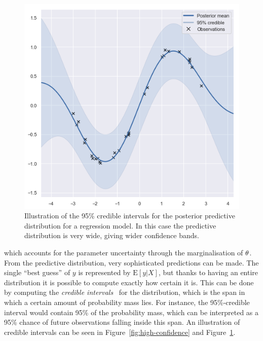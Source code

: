 \begin{figure}
\begin{minipage}{.46\textwidth}
    \includegraphics[scale=0.5,width=\textwidth]{figures/low-confidence}
    \caption{Illustration of the 95\% credible intervals for the
    posterior predictive distribution for a regression model. In this
    case the predictive distribution is very wide, giving wider
    confidence bands.}\label{fig:low-confidence}
  \end{minipage}
\end{figure}

which accounts for the parameter uncertainty through the
marginalisation of $\theta$. From the predictive distribution,
very sophisticated predictions can be made. The single ``best guess'' of $y$
is represented by $\text{E}[y \vert X]$, but thanks to having
an entire distribution it is possible to compute exactly how certain
it is. This can be done by computing the \textit{credible
  intervals}~\cite{Morey2016Feb} for the distribution, which is the
span in which a certain amount of probability mass lies. For instance,
the 95\%-credible interval would contain 95\% of the probability mass,
which can be interpreted as a 95\% chance of future observations
falling inside this span. An illustration of credible intervals can be seen in
Figure~\ref{fig:high-confidence} and Figure~\ref{fig:low-confidence}.

